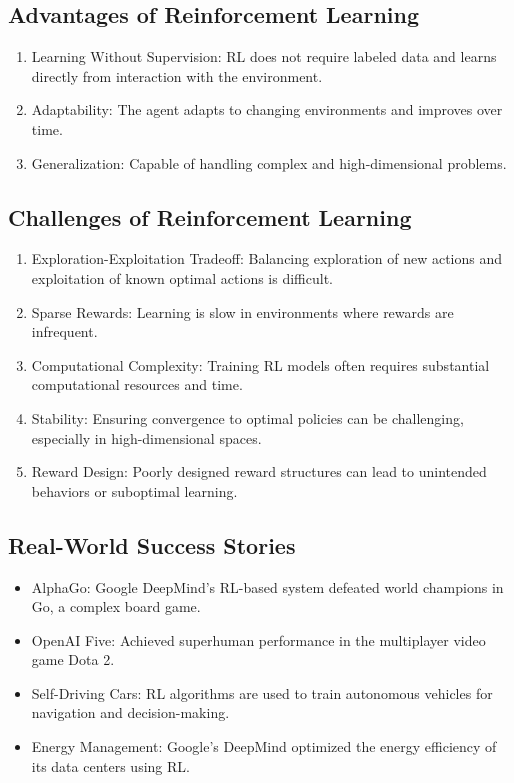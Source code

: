 \subsection*{Advantages of Reinforcement Learning}

\begin{enumerate}
    \item Learning Without Supervision: RL does not require labeled data and learns directly from interaction with the environment.
    \item Adaptability: The agent adapts to changing environments and improves over time.
    \item Generalization: Capable of handling complex and high-dimensional problems.
\end{enumerate}

\subsection*{Challenges of Reinforcement Learning}

\begin{enumerate}
    \item Exploration-Exploitation Tradeoff: Balancing exploration of new actions and exploitation of known optimal actions is difficult.
    \item Sparse Rewards: Learning is slow in environments where rewards are infrequent.
    \item Computational Complexity: Training RL models often requires substantial computational resources and time.
    \item Stability: Ensuring convergence to optimal policies can be challenging, especially in high-dimensional spaces.
    \item Reward Design: Poorly designed reward structures can lead to unintended behaviors or suboptimal learning.
\end{enumerate}

\subsection*{Real-World Success Stories}

\begin{itemize}
    \item AlphaGo: Google DeepMind’s RL-based system defeated world champions in Go, a complex board game.
    \item OpenAI Five: Achieved superhuman performance in the multiplayer video game Dota 2.
    \item Self-Driving Cars: RL algorithms are used to train autonomous vehicles for navigation and decision-making.
    \item Energy Management: Google’s DeepMind optimized the energy efficiency of its data centers using RL.
\end{itemize}

